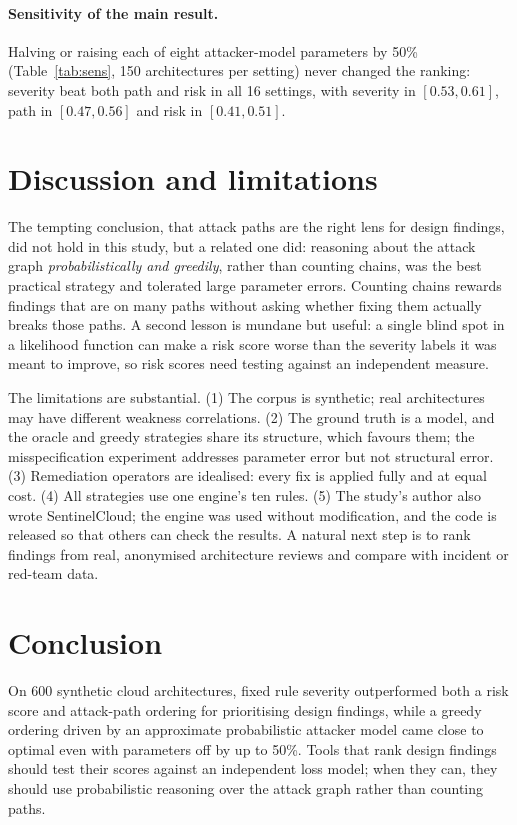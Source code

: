 \documentclass[11pt]{article}
\begin{document}
\paragraph{Sensitivity of the main result.} Halving or raising each of eight attacker-model parameters by 50\% (Table~\ref{tab:sens},
150 architectures per setting) never changed the ranking: severity beat both path and risk in all 16 settings, with severity in
\([0.53, 0.61]\), path in \([0.47, 0.56]\) and risk in \([0.41, 0.51]\).



\section{Discussion and limitations}
The tempting conclusion, that attack paths are the right lens for design findings, did not hold in this study, but a related one did:
reasoning about the attack graph \emph{probabilistically and greedily}, rather than counting chains, was the best practical strategy and
tolerated large parameter errors. Counting chains rewards findings that are on many paths without asking whether fixing them actually
breaks those paths. A second lesson is mundane but useful: a single blind spot in a likelihood function can make a risk score worse than
the severity labels it was meant to improve, so risk scores need testing against an independent measure.

The limitations are substantial. (1) The corpus is synthetic; real architectures may have different weakness correlations. (2) The ground
truth is a model, and the oracle and greedy strategies share its structure, which favours them; the misspecification experiment addresses
parameter error but not structural error. (3) Remediation operators are idealised: every fix is applied fully and at equal cost.
(4) All strategies use one engine's ten rules. (5) The study's author also wrote SentinelCloud; the engine was used without modification,
and the code is released so that others can check the results. A natural next step is to rank findings from real, anonymised
architecture reviews and compare with incident or red-team data.

\section{Conclusion}
On 600 synthetic cloud architectures, fixed rule severity outperformed both a risk score and attack-path ordering for prioritising design
findings, while a greedy ordering driven by an approximate probabilistic attacker model came close to optimal even with parameters off by
up to 50\%. Tools that rank design findings should test their scores against an independent loss model; when they can, they should use
probabilistic reasoning over the attack graph rather than counting paths.
\end{document}
